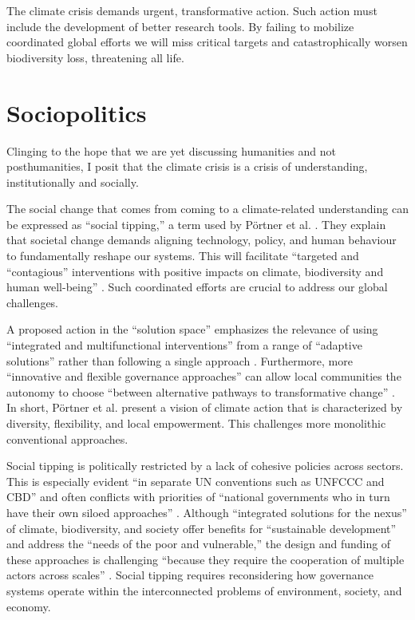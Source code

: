 The climate crisis demands urgent, transformative action. Such action must include the development of better research tools. By failing to mobilize coordinated global efforts we will miss critical targets and catastrophically worsen biodiversity loss, threatening all life.
\section{Sociopolitics}
Clinging to the hope that we are yet discussing humanities and not posthumanities, I posit that the climate crisis is a crisis of understanding, institutionally and socially. 

The social change that comes from coming to a climate-related understanding can be expressed as “social tipping,” a term used by Pörtner et al. \citep{portner_overcoming_2023}. They explain that societal change demands aligning technology, policy, and human behaviour to fundamentally reshape our systems. This will facilitate “targeted and “contagious” interventions with positive impacts on climate, biodiversity and human well-being” \citep[p. 7]{portner_overcoming_2023}. Such coordinated efforts are crucial to address our global challenges.

A proposed action in the “solution space” emphasizes the relevance of using “integrated and multifunctional interventions” from a range of “adaptive solutions” rather than following a single approach \citep[p. 1]{portner_overcoming_2023}. Furthermore, more “innovative and flexible governance approaches” can allow local communities the autonomy to choose “between alternative pathways to transformative change” \citep[p. 7]{portner_overcoming_2023}. In short, Pörtner et al. present a vision of climate action that is characterized by diversity, flexibility, and local empowerment. This challenges more monolithic conventional approaches.

Social tipping is politically restricted by a lack of cohesive policies across sectors. This is especially evident “in separate UN conventions such as UNFCCC and CBD” and often conflicts with priorities of “national governments who in turn have their own siloed approaches” \citep[p. 7]{portner_overcoming_2023}. Although “integrated solutions for the nexus” of climate, biodiversity, and society offer benefits for “sustainable development” and address the “needs of the poor and vulnerable,” the design and funding of these approaches is challenging “because they require the cooperation of multiple actors across scales” \citep[p. 7]{portner_overcoming_2023}. Social tipping requires reconsidering how governance systems operate within the interconnected problems of environment, society, and economy.

